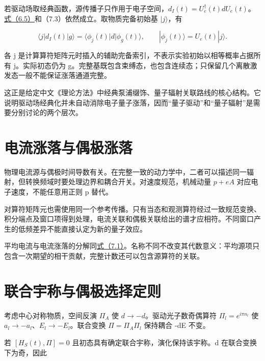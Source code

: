 \documentclass[UTF8,a4paper,zihao=-4,openany,fontset=fandol]{ctexbook}
\begin{document}
若驱动场取经典函数，源传播子只作用于电子空间，$d_I(t)=U_e^\dagger(t)dU_e(t)$。\hyperref[eq:6.5]{式（6.5）}和（7.3）依然成立。取物质完备初始基 $|j\rangle$，有



\begin{equation*}
\langle j|d_I(t)|g\rangle
=\langle\phi_j(t)|d|\phi_g(t)\rangle,
\qquad |\phi_j(t)\rangle=U_e(t)|j\rangle.
\tag{7.4}\label{eq:7.4}
\end{equation*}


各 j 是计算算符矩阵元时插入的辅助完备索引，不表示实验初始以相等概率占据所有 j。实际初态仍为 g。完整基既包含束缚态，也包含连续态；只保留几个离散激发态一般不能保证涨落通道完整。



这正是给定中文《理论方法》中经典泵浦缀饰、量子辐射关联路线的核心结构。它说明驱动场经典化并未自动消除电子量子涨落，因而“量子驱动”和“量子辐射”是需要分别讨论的两个层次。



\section{电流涨落与偶极涨落}\label{sec:07:6}


物理电流源与偶极时间导数有关。在完整一致的动力学中，二者可以描述同一辐射，但转换频域时要处理边界和耦合开关。对速度规范，机械动量 $p+eA$ 对应电子速度，不能任意用正则 p 替代。



对算符矩阵元也需使用同一个参考传播。只有当态和观测算符经过一致规范变换、积分端点及窗口项得到处理，电流关联和偶极关联给出的谱才应相符。不同窗口产生的低频差异不能直接认定为新的量子效应。



平均电流与电流涨落的分解同\hyperref[eq:7.1]{式（7.1）}。名称不同不改变其代数意义：平均源项只包含一次期望的相干贡献，完整计数还可以包含源算符的关联。



\section{联合宇称与偶极选择定则}\label{sec:07:7}


考虑中心对称物质，空间反演 $\Pi_A$ 使 $d\to-d$。驱动光子数奇偶算符 $\Pi_l=e^{i\pi n_l}$ 使 $a_l\to-a_l$、$E_l\to-E_l$。联合变换 $\Pi=\Pi_A\Pi_l$ 保持耦合 -dE 不变。



若 $[H_S(t),\Pi]=0$ 且初态具有确定联合宇称，演化保持该宇称。d 在联合变换下为奇，因此
\end{document}
